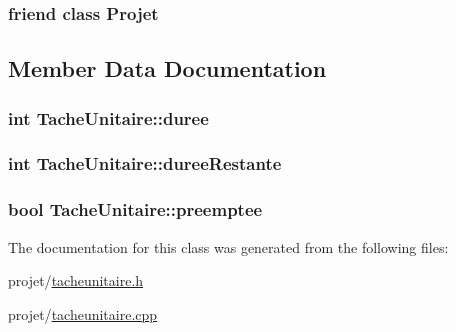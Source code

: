 \subsubsection[{Projet}]{\setlength{\rightskip}{0pt plus 5cm}friend class {\bf Projet}\hspace{0.3cm}{\ttfamily [friend]}}\label{class_tache_unitaire_ab87b41c3faa36955cc370972f5cce344}


\subsection{Member Data Documentation}
\hypertarget{class_tache_unitaire_a5510c1941069a4391e076ec45e0201fc}{}
\subsubsection[{duree}]{\setlength{\rightskip}{0pt plus 5cm}int Tache\+Unitaire\+::duree\hspace{0.3cm}{\ttfamily [private]}}\label{class_tache_unitaire_a5510c1941069a4391e076ec45e0201fc}
\hypertarget{class_tache_unitaire_a73dd33a7047739e49c80373aeae3158e}{}
\subsubsection[{duree\+Restante}]{\setlength{\rightskip}{0pt plus 5cm}int Tache\+Unitaire\+::duree\+Restante\hspace{0.3cm}{\ttfamily [private]}}\label{class_tache_unitaire_a73dd33a7047739e49c80373aeae3158e}
\hypertarget{class_tache_unitaire_a21bc1074f99a80976a52d910e3c21041}{}
\subsubsection[{preemptee}]{\setlength{\rightskip}{0pt plus 5cm}bool Tache\+Unitaire\+::preemptee\hspace{0.3cm}{\ttfamily [private]}}\label{class_tache_unitaire_a21bc1074f99a80976a52d910e3c21041}


The documentation for this class was generated from the following files\+:\begin{DoxyCompactItemize}
\item 
projet/\hyperlink{tacheunitaire_8h}{tacheunitaire.\+h}\item 
projet/\hyperlink{tacheunitaire_8cpp}{tacheunitaire.\+cpp}\end{DoxyCompactItemize}
